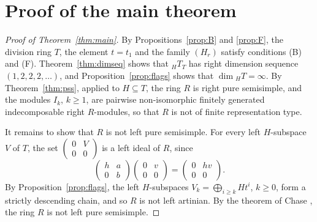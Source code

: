 \documentclass[11pt,a4paper]{amsart}
\numberwithin{equation}{section}
\begin{document}
\section{Proof of the main theorem}\label{sec:proof}

\begin{proof}[Proof of Theorem~\ref{thm:main}]
By Propositions~\ref{prop:B} and \ref{prop:F}, the division ring $T$, the element $t=t_1$ and the family $(H_r)$ satisfy conditions (B) and (F). Theorem~\ref{thm:dimseq} shows that ${}_HT_T$ has right dimension sequence $(1,2,2,2,\dots)$, and Proposition~\ref{prop:flags} shows that $\dim{}_HT=\infty$. By Theorem~\ref{thm:pss}, applied to $H\subseteq T$, the ring $R$ is right pure semisimple, and the modules $I_k$, $k\ge1$, are pairwise non-isomorphic finitely generated indecomposable right $R$-modules, so that $R$ is not of finite representation type.

It remains to show that $R$ is not left pure semisimple. For every left $H$-subspace $V$ of $T$, the set $\left(\begin{smallmatrix}0&V\\0&0\end{smallmatrix}\right)$ is a left ideal of $R$, since
\[
\begin{pmatrix}h&a\\0&b\end{pmatrix}\begin{pmatrix}0&v\\0&0\end{pmatrix}=\begin{pmatrix}0&hv\\0&0\end{pmatrix}.
\]
By Proposition~\ref{prop:flags}, the left $H$-subspaces $V_k=\bigoplus_{i\ge k}Ht^i$, $k\ge0$, form a strictly descending chain, and so $R$ is not left artinian. By the theorem of Chase \cite{Ch}, the ring $R$ is not left pure semisimple.
\end{proof}
\end{document}
